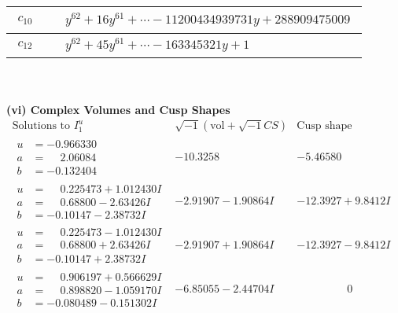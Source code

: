 \documentclass[1p]{elsarticle_modified}
\theoremstyle{definition}
\newcommand{\I}{\sqrt{-1}}
\begin{document}
\begin{tabular}{m{50pt}|m{274pt}}
\hline $$\begin{aligned}c_{10}\end{aligned}$$&$\begin{aligned}
&y^{62}+16 y^{61}+\cdots-11200434939731 y+288909475009
\end{aligned}$\\
\hline $$\begin{aligned}c_{12}\end{aligned}$$&$\begin{aligned}
&y^{62}+45 y^{61}+\cdots-163345321 y+1
\end{aligned}$\\
\hline
\end{tabular}\\~\\
\newpage\flushleft \textbf{(vi) Complex Volumes and Cusp Shapes}
$$\begin{array}{c|c|c}  
\text{Solutions to }I^u_{1}& \I (\text{vol} + \sqrt{-1}CS) & \text{Cusp shape}\\
 \hline 
\begin{aligned}
u &= -0.966330\phantom{ +0.000000I} \\
a &= \phantom{-}2.06084\phantom{ +0.000000I} \\
b &= -0.132404\phantom{ +0.000000I}\end{aligned}
 & -10.3258\phantom{ +0.000000I} & -5.46580\phantom{ +0.000000I} \\ \hline\begin{aligned}
u &= \phantom{-}0.225473 + 1.012430 I \\
a &= \phantom{-}0.68800 - 2.63426 I \\
b &= -0.10147 - 2.38732 I\end{aligned}
 & -2.91907 - 1.90864 I & -12.3927 + 9.8412 I \\ \hline\begin{aligned}
u &= \phantom{-}0.225473 - 1.012430 I \\
a &= \phantom{-}0.68800 + 2.63426 I \\
b &= -0.10147 + 2.38732 I\end{aligned}
 & -2.91907 + 1.90864 I & -12.3927 - 9.8412 I \\ \hline\begin{aligned}
u &= \phantom{-}0.906197 + 0.566629 I \\
a &= \phantom{-}0.898820 - 1.059170 I \\
b &= -0.080489 - 0.151302 I\end{aligned}
 & -6.85055 - 2.44704 I & \phantom{-0.000000 } 0 \\ \hline\begin{aligned}

\end{aligned}
\end{array}$$
\end{document}
